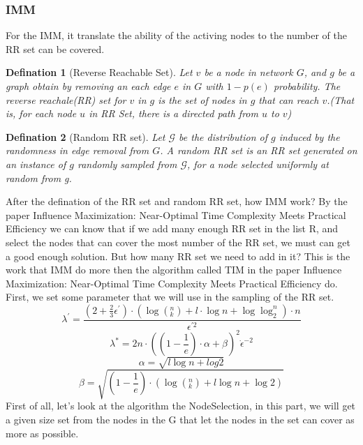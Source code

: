 \documentclass[conference,compsoc]{IEEEtran}
\newtheorem{theorem}{Defination}
\begin{document}
    \subsubsection{IMM}
      For the IMM, it translate the ability of the activing nodes to the number of the RR set can be covered.
      \begin{theorem}[Reverse Reachable Set]
        Let $v$ be a node in network $G$, and $g$ be a graph obtain by removing an each edge $e$ in $G$ with $1-p(e)$ probability. The reverse reachale(RR) set for $v$ in $g$ is the set of nodes in $g$ that can reach $v$.(That is, for each node $u$ in RR Set, there is a directed path from $u$ to $v$)
      \end{theorem}
      \begin{theorem}[Random RR set]
        Let $\mathcal{G}$ be the distribution of $g$ induced by the randomness in edge removal from $G$. A random RR set is an RR set generated on an instance of $g$ randomly sampled from $\mathcal{G}$, for a node selected uniformly at random from g.
      \end{theorem}
      After the defination of the RR set and random RR set, how IMM work? By the paper Influence Maximization: Near-Optimal Time Complexity Meets Practical Efficiency\cite{} we can know that if we add many enough RR set in the list R, and select the nodes that can cover the most number of the RR set, we must can get a good enough solution. But how many RR set we need to add in it? This is the work that IMM do more then the algorithm called TIM in the paper Influence Maximization: Near-Optimal Time Complexity Meets Practical Efficiency \cite{} do.
      First, we set some parameter that we will use in the sampling of the RR set.
      \begin{equation}        
        \lambda^{'} = \frac{(2+\frac{2}{3}\epsilon^{'})\cdot (\log(^{n}_{k})+l\cdot \log n+\log\log_{2}^{n})\cdot n}{\epsilon^{'2}}
      \end{equation}
      \begin{equation}
        \lambda^{*} = 2n\cdot ((1-\frac{1}{e})\cdot\alpha +\beta)^2\dot\epsilon^{-2}
      \end{equation}
      \begin{equation}
        \alpha = \sqrt{l\log n+log 2}
      \end{equation}
      \begin{equation}
        \beta = \sqrt{(1-\frac{1}{e})\cdot(\log(^n_k)+l\log n+ \log 2)}
      \end{equation}
      First of all, let's look at the algorithm the NodeSelection, in this part, we will get a given size set from the nodes in the G that let the nodes in the set can cover as more as possible.
\end{document}
